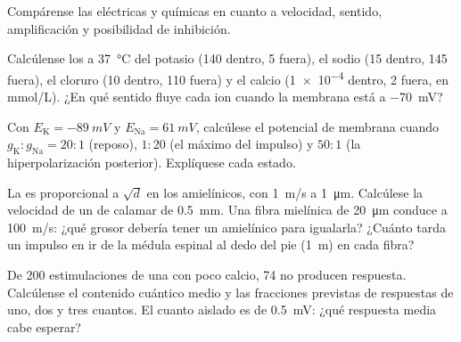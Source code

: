 \begin{exercise}[$\star$]\label{exo:b2:neurons-synapses:4}
Compárense las  eléctricas y químicas en cuanto a velocidad,
sentido, amplificación y posibilidad de inhibición.
\end{exercise}

\begin{exercise}[$\star\star$]\label{exo:b2:neurons-synapses:5}
Calcúlense los  a \qty{37}{\celsius} del potasio
(140 dentro, 5 fuera), el sodio (15 dentro, 145 fuera), el cloruro
(10 dentro, 110 fuera) y el calcio (\qty{1e-4}{} dentro, 2 fuera, en
\unit{mmol/L}). ¿En qué sentido fluye cada ion cuando la membrana está a
\qty{-70}{mV}?
\end{exercise}

\begin{exercise}[$\star\star$]\label{exo:b2:neurons-synapses:6}
Con $E_{\mathrm K} = \qty{-89}{mV}$ y $E_{\mathrm{Na}} =
\qty{+61}{mV}$, calcúlese el potencial de membrana cuando $g_{\mathrm K} :
g_{\mathrm{Na}} = 20 : 1$ (reposo), $1 : 20$ (el máximo del impulso)
y $50 : 1$ (la hiperpolarización posterior). Explíquese cada estado.
\end{exercise}

\begin{exercise}[$\star\star$]\label{exo:b2:neurons-synapses:7}
La  es proporcional a $\sqrt d$ en los 
amielínicos, con \qty{1}{m/s} a \qty{1}{\micro m}. Calcúlese la velocidad
de un  de calamar de \qty{0.5}{mm}. Una fibra mielínica de
\qty{20}{\micro m} conduce a \qty{100}{m/s}: ¿qué grosor debería tener un
 amielínico para igualarla? ¿Cuánto tarda un impulso en ir de la
médula espinal al dedo del pie (\qty{1}{m}) en cada fibra?
\end{exercise}

\begin{exercise}[$\star\star$]\label{exo:b2:neurons-synapses:8}
De 200 estimulaciones de una  con poco calcio, 74 no producen
respuesta. Calcúlense el contenido cuántico medio y las fracciones
previstas de respuestas de uno, dos y tres cuantos. El cuanto aislado es de
\qty{0.5}{mV}: ¿qué respuesta media cabe esperar?
\end{exercise}

